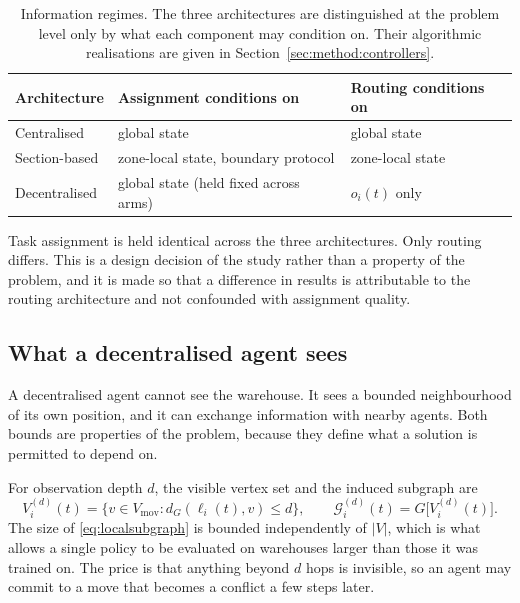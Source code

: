 \documentclass[../main.tex]{subfiles}
\begin{document}
\begin{table}[t]
  \centering
  \caption{Information regimes. The three architectures are distinguished at the
  problem level only by what each component may condition on. Their algorithmic
  realisations are given in Section~\ref{sec:method:controllers}.}
  \label{tab:information}
  \begin{tabular}{lll}
    \toprule
    Architecture & Assignment conditions on & Routing conditions on \\
    \midrule
    Centralised     & global state & global state \\
    Section-based   & zone-local state, boundary protocol & zone-local state \\
    Decentralised   & global state (held fixed across arms) & $o_i(t)$ only \\
    \bottomrule
  \end{tabular}
\end{table}

Task assignment is held identical across the three architectures. Only routing
differs. This is a design decision of the study rather than a property of the
problem, and it is made so that a difference in results is attributable to the
routing architecture and not confounded with assignment quality.

\subsection{What a decentralised agent sees}
\label{sec:pf:observations}

A decentralised agent cannot see the warehouse. It sees a bounded neighbourhood
of its own position, and it can exchange information with nearby agents. Both
bounds are properties of the problem, because they define what a solution is
permitted to depend on.

For observation depth $d$, the visible vertex set and the induced subgraph are
\begin{equation}
  V^{(d)}_i(t) = \{ v \in V_{\mathrm{mov}} : d_G(\ell_i(t), v) \le d \},
  \qquad
  \mathcal{G}^{(d)}_i(t) = G\bigl[V^{(d)}_i(t)\bigr].
  \label{eq:localsubgraph}
\end{equation}
The size of \eqref{eq:localsubgraph} is bounded independently of $|V|$, which is
what allows a single policy to be evaluated on warehouses larger than those it
was trained on. The price is that anything beyond $d$ hops is invisible, so an
agent may commit to a move that becomes a conflict a few steps later.
\end{document}
